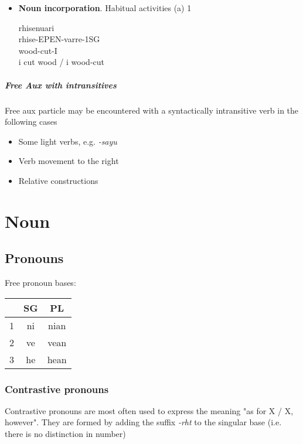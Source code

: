 \documentclass[8pt]{book}
\begin{document}
\begin{itemize}
\item \textbf{Noun incorporation}. Habitual activities (a)
1  
  \begin{xlista}
    \ex rhisenuari \\
        rhise-EPEN-varre-1SG \\
        wood-cut-I \\
        i cut wood / i wood-cut
  \end{xlista}

\end{itemize}

\paragraph{Free Aux with intransitives}
Free aux particle may be encountered with a syntactically intransitive verb in the following cases

\begin{itemize}
\item Some light verbs, e.g. \textit{-sayu} 
\item Verb movement to the right
\item Relative constructions
\end{itemize}


\chapter{Noun}

\section{Pronouns}

\begin{center}
Free pronoun bases:

\begin{tabular}{l|c|c}
	\hline
	& SG & PL \\\hline
	1 & ni & nian \\\hline
	2 & ve & vean \\\hline
	3 & he & hean \\\hline
\end{tabular}

\end{center}

\subsection{Contrastive pronouns}
Contrastive pronouns are most often used to express the meaning "as for X / X, however". They are formed by adding the suffix \textit{-rht} to the singular base (i.e. there is no distinction in number)
\end{document}

